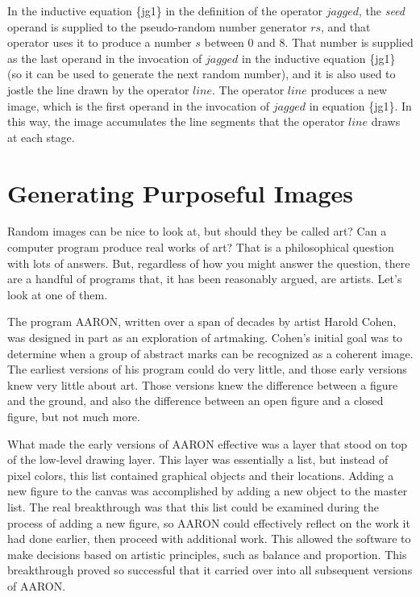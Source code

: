 In the inductive equation \{jg1\} in the definition of the operator $jagged$,
the \emph{seed} operand is supplied to the pseudo-random
number generator $rs$, and that operator uses it to produce
a number $s$ between 0 and 8. That number is supplied as the last
operand in the invocation of $jagged$ in the inductive equation \{jg1\}
(so it can be used to generate the next random number),
and it is also used to jostle the line drawn by the operator $line$.
The operator $line$ produces a new image,
which is the first operand in the invocation of $jagged$ in equation \{jg1\}.
In this way, the image accumulates the line segments that the operator $line$
draws at each stage.

\section{Generating Purposeful Images}

Random images can be nice to look at, but should they be called art? 
Can a computer program produce real works of art? 
That is a philosophical question with lots of answers. 
But, regardless of how you might answer the question, 
there are a handful of programs that, it has been reasonably argued, 
are artists. Let's look at one of them.

The program AARON, 
written over a span of decades by artist Harold Cohen, 
was designed in part as an exploration of artmaking. Cohen's
initial goal was to determine when a group of abstract marks can
be recognized as a coherent image. The earliest versions of his program
could do very little, and those early versions knew very little about art. 
Those versions knew the difference between a figure and the ground, and also
the difference between an open figure and a closed figure, but
not much more.

What made the early versions of AARON effective was a layer that
stood on top of the low-level drawing layer. This layer was essentially
a list, but instead of pixel colors, this list contained graphical objects
and their locations. Adding a new figure to the canvas was accomplished
by adding a new object to the master list. The real breakthrough was
that this list could be examined during the process of adding
a new figure, so AARON could effectively reflect on the work it had
done earlier, then proceed with additional work. 
This allowed the software to make decisions based on
artistic principles, such as balance and proportion. 
This breakthrough proved so successful 
that it carried over into all subsequent versions of AARON.

